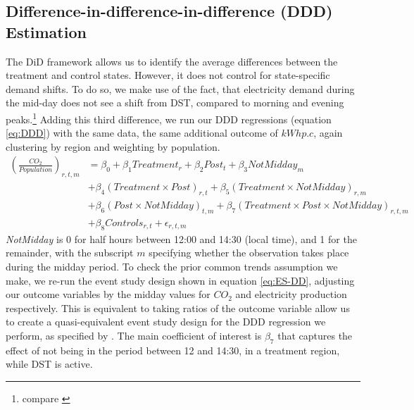 \subsection{Difference-in-difference-in-difference (DDD) Estimation}
The \ac{DiD} framework allows us to identify the average differences between the treatment and control states. However, it does not control for state-specific demand shifts. To do so, we make use of the fact, that electricity demand during the mid-day does not see a shift from DST, compared to morning and evening peaks.\footnote{compare \textcite{kellogg_daylight_2008}} 
Adding this third difference, we run our DDD regressions (equation \ref{eq:DDD}) with the same data, the same additional outcome of $kWh p.c$, again clustering by region and weighting by population.
\begin{align}
    \label{eq:DDD}
    \left(\frac{CO_2}{Population}\right)_{r,t,m} &= \beta_0 + \beta_1Treatment_{r} + \beta_2Post_{t} + \beta_3NotMidday_{m}   \\
    & +\beta_4(Treatment \times Post)_{r,t} + 
    \beta_5(Treatment \times NotMidday)_{r,m} \nonumber \\ 
    & +\beta_6(Post \times NotMidday)_{t,m} + \beta_7 (Treatment \times Post \times NotMidday)_{r,t,m} \nonumber \\ 
    &+ \beta_8 Controls_{r,t}  + \epsilon_{r,t,m}
    \nonumber 
\end{align}
\textit{NotMidday} is 0 for half hours between 12:00 and 14:30 (local time), and 1 for the remainder, with the subscript $m$ specifying whether the observation takes place during the midday period.
To check the prior common trends assumption we make, we re-run the event study design shown in equation \ref{eq:ES-DD}, adjusting our outcome variables by the midday values for $CO_2$ and electricity production respectively. This is equivalent to taking ratios of the outcome variable allow us to create a quasi-equivalent event study design for the DDD regression we perform, as specified by \textcite{olden_triple_2022}. The main coefficient of interest is $\beta_7$ that captures the effect of not being in the period between 12 and 14:30, in a treatment region, while \ac{DST} is active.
